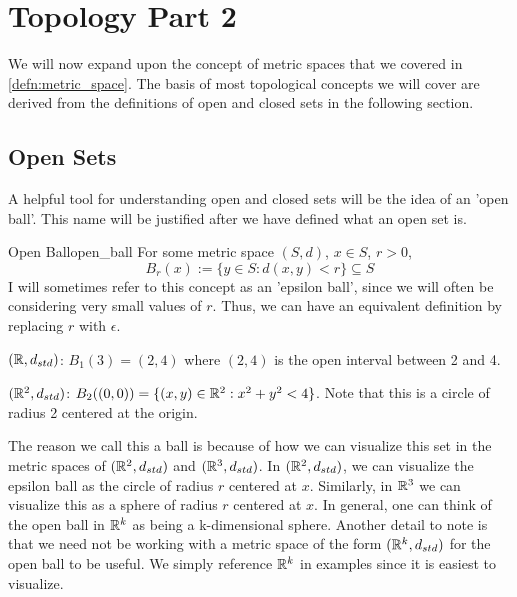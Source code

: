 \section{Topology Part 2}
We will now expand upon the concept of metric spaces that we covered in \ref{defn:metric_space}. The basis of most topological concepts we will cover are derived from the  definitions of open and closed sets in the following section. 
\subsection{Open Sets}
A helpful tool for understanding open and closed sets will be the idea of an 'open ball'. This name will be justified after we have defined what an open set is.
\begin{defn}{Open Ball}{open_ball}
For some metric space \((S, d)\), \(x\in S\), \(r > 0\),
\begin{displaymath}
  B_r(x) := \{y \in S: d(x,y) < r\} \subseteq S
\end{displaymath}
I will sometimes refer to this concept as an 'epsilon ball', since we will often be considering very small values of \(r\). Thus, we can have an equivalent definition by replacing \(r\) with \(\epsilon\).
\end{defn}

\begin{exmp}{}{}
\(({\mathbb R}, d_{std})\): \(B_1(3) = (2,4)\) where \((2,4)\) is the open interval between 2 and 4.
\end{exmp}
\begin{exmp}{}{}
\(({\mathbb R}^2, d_{std})\): \(B_2((0, 0)) = \{(x, y) \in {\mathbb R}^2: x^2 + y^2 < 4\}\). Note that this is a circle of radius 2 centered at the origin.
\end{exmp}

The reason we call this a ball is because of how we can visualize this set in the metric spaces of \(({\mathbb R}^2,d_{std})\) and \(({\mathbb R}^3, d_{std})\). In \(({\mathbb R}^2,d_{std})\), we can visualize the epsilon ball as the circle of radius \(r\) centered at \(x\). Similarly, in \({\mathbb R}^3\) we can visualize this as a sphere of radius \(r\) centered at \(x\). In general, one can think of the open ball in \({\mathbb R}^k\) as being a k-dimensional sphere. Another detail to note is that we need not be working with a metric space of the form \(({\mathbb R}^k, d_{std})\) for the open ball to be useful. We simply reference \({\mathbb R}^k\) in examples since it is easiest to visualize. 
\newline

 


